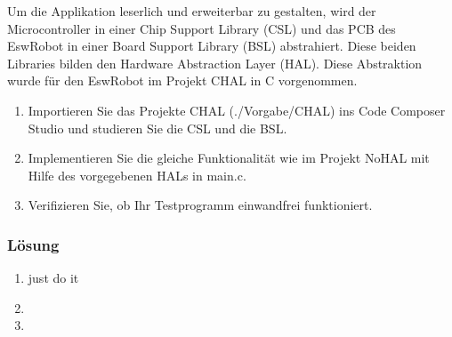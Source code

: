 Um die Applikation leserlich und erweiterbar zu gestalten, wird der Microcontroller in einer Chip Support Library
(CSL) und das PCB des EswRobot in einer Board Support Library (BSL) abstrahiert. Diese beiden Libraries
bilden den Hardware Abstraction Layer (HAL). Diese Abstraktion wurde für den EswRobot im Projekt
CHAL in C vorgenommen.

\begin{enumerate}
  \item Importieren Sie das Projekte CHAL (./Vorgabe/CHAL) ins Code Composer Studio und studieren Sie die
CSL und die BSL.
\item  Implementieren Sie die gleiche Funktionalität wie im Projekt NoHAL mit Hilfe des vorgegebenen HALs in
main.c.
\item Verifizieren Sie, ob Ihr Testprogramm einwandfrei funktioniert.
\end{enumerate}

\subsubsection{Lösung}
\begin{enumerate}
  \item just do it
  \item 
  \item 
  \noindent\makebox[\linewidth]{\rule{\paperwidth}{0.4pt}}
  
  \noindent\makebox[\linewidth]{\rule{\paperwidth}{0.4pt}}
  
  \noindent\makebox[\linewidth]{\rule{\paperwidth}{0.4pt}}
  
  \noindent\makebox[\linewidth]{\rule{\paperwidth}{0.4pt}}
  \noindent\makebox[\linewidth]{\rule{\paperwidth}{0.4pt}}
  
  
  \noindent\makebox[\linewidth]{\rule{\paperwidth}{0.4pt}}
  
  \noindent\makebox[\linewidth]{\rule{\paperwidth}{0.4pt}}
  
  \noindent\makebox[\linewidth]{\rule{\paperwidth}{0.4pt}}
  
  \noindent\makebox[\linewidth]{\rule{\paperwidth}{0.4pt}}

\end{enumerate}

